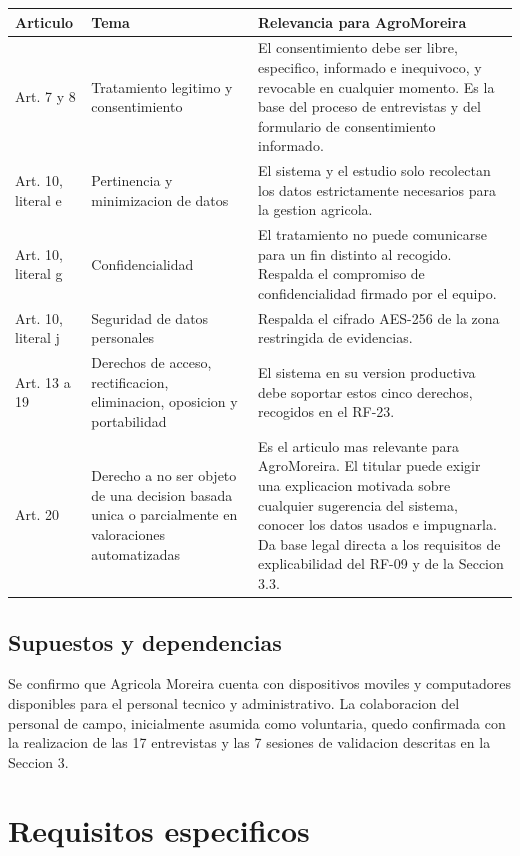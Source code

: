 \documentclass[11pt,a4paper]{article}
\begin{document}
\begin{longtable}{L{2.4cm} L{4cm} L{9cm}}
\toprule
\textbf{Articulo} & \textbf{Tema} & \textbf{Relevancia para AgroMoreira} \\
\midrule
\endhead
Art. 7 y 8 & Tratamiento legitimo y consentimiento & El consentimiento debe ser libre, especifico, informado e inequivoco, y revocable en cualquier momento. Es la base del proceso de entrevistas y del formulario de consentimiento informado. \\
\addlinespace
Art. 10, literal e & Pertinencia y minimizacion de datos & El sistema y el estudio solo recolectan los datos estrictamente necesarios para la gestion agricola. \\
\addlinespace
Art. 10, literal g & Confidencialidad & El tratamiento no puede comunicarse para un fin distinto al recogido. Respalda el compromiso de confidencialidad firmado por el equipo. \\
\addlinespace
Art. 10, literal j & Seguridad de datos personales & Respalda el cifrado AES-256 de la zona restringida de evidencias. \\
\addlinespace
Art. 13 a 19 & Derechos de acceso, rectificacion, eliminacion, oposicion y portabilidad & El sistema en su version productiva debe soportar estos cinco derechos, recogidos en el RF-23. \\
\addlinespace
Art. 20 & Derecho a no ser objeto de una decision basada unica o parcialmente en valoraciones automatizadas & Es el articulo mas relevante para AgroMoreira. El titular puede exigir una explicacion motivada sobre cualquier sugerencia del sistema, conocer los datos usados e impugnarla. Da base legal directa a los requisitos de explicabilidad del RF-09 y de la Seccion 3.3. \\
\bottomrule
\end{longtable}

\subsection{Supuestos y dependencias}

Se confirmo que Agricola Moreira cuenta con dispositivos moviles y computadores disponibles para el personal tecnico y administrativo. La colaboracion del personal de campo, inicialmente asumida como voluntaria, quedo confirmada con la realizacion de las 17 entrevistas y las 7 sesiones de validacion descritas en la Seccion 3.

\section{Requisitos especificos}
\end{document}
